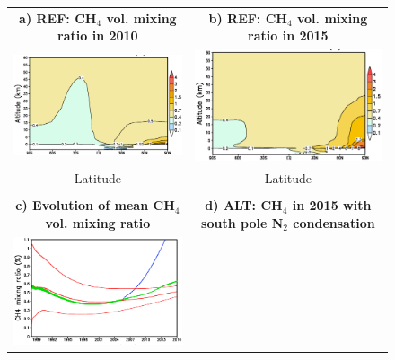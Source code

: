 \begin{figure}
  \begin{center}
\renewcommand{\arraystretch}{0.2}
\begin{tabular}[h]{cc}
\hspace{-1.cm}
{\bf a)  REF: CH$_4$ vol. mixing ratio in 2010 } &
{\bf b) REF: CH$_4$ vol. mixing ratio in 2015 } \\
\hspace{-1.cm}
   \includegraphics[height=5.cm,angle=-0,clip]{figures/section_ch4_2010.eps} &
   \includegraphics[height=5.cm,angle=-0,clip]{figures/section_ch4_2015.eps} \\
\hspace{-1.cm}
 Latitude & Latitude \\
\vspace{0.5cm} \\
\hspace{-1.cm}
{\bf c) Evolution of mean CH$_4$ vol. mixing ratio} &
{\bf d) ALT: CH$_4$ in 2015 with south pole N$_2$ condensation} \\
\hspace{-1.cm}
   \includegraphics[height=5.cm,angle=-0,clip]{figures/evol_ch4.eps} &

\end{tabular}
\end{center}
\end{figure}
